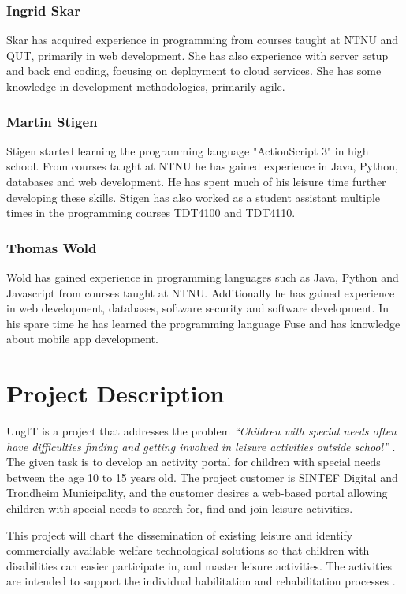 \subsubsection{Ingrid Skar}
Skar has acquired experience in programming from courses taught at NTNU and QUT, primarily in web development. She has also experience with server setup and back end coding, focusing on deployment to cloud services. She has some knowledge in development methodologies, primarily agile. 

\subsubsection{Martin Stigen}
Stigen started learning the programming language "ActionScript 3" in high school. From courses taught at NTNU he has gained experience in Java, Python, databases and web development. He has spent much of his leisure time further developing these skills. Stigen has also worked as a student assistant multiple times in the programming courses TDT4100 and TDT4110.

\subsubsection{Thomas Wold}
Wold has gained experience in programming languages such as Java, Python and Javascript from courses taught at NTNU. Additionally he has gained experience in web development, databases, software security and software development. In his spare time he has learned the programming language Fuse and has knowledge about mobile app development.

\section{Project Description}
UngIT is a project that addresses the problem \textit{“Children with special needs often have difficulties finding and getting involved in leisure activities outside school”} \cite{SintefBachelorProjectDescription}. The given task is to develop an activity portal for children with special needs between the age 10 to 15 years old. The project customer is SINTEF Digital and Trondheim Municipality, and the customer desires a web-based portal allowing children with special needs to search for, find and join leisure activities.

This project will chart the dissemination of existing leisure and identify commercially available welfare technological solutions so that children with disabilities can easier participate in, and master leisure activities. The activities are intended to support the individual habilitation and rehabilitation processes \cite{SintefOnlineProjectDescription}.

